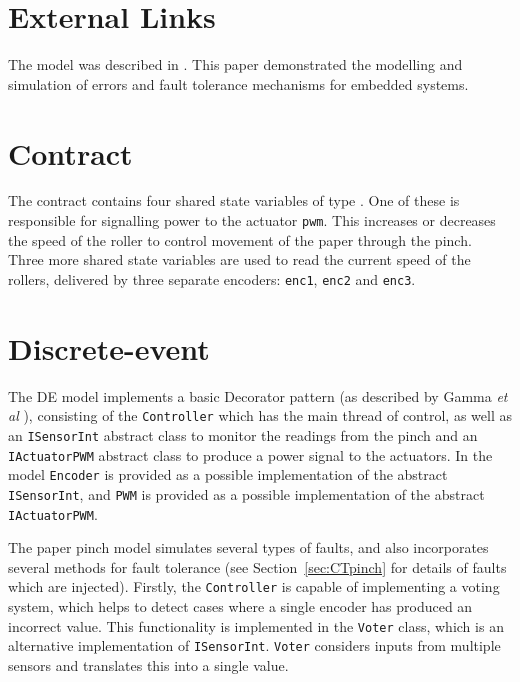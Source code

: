 \section{External Links}
The model was described in \cite{Pierce&11}.  This paper demonstrated
the modelling and simulation of errors and fault tolerance mechanisms
for embedded systems.

\section{Contract} The contract contains four shared state
variables of type . One of these is responsible for
signalling power to the actuator \texttt{pwm}. This increases or
decreases the speed of the roller to control movement of the
paper through the pinch. Three more shared state variables are
used to read the current speed of the rollers, delivered by
three separate encoders: \texttt{enc1}, \texttt{enc2} and
\texttt{enc3}. %

\section{Discrete-event} The DE model implements a basic Decorator
pattern (as described by Gamma \emph{et al} \cite{gamma}), consisting
of the \texttt{Controller} which has the main thread of control, as
well as an \texttt{ISensorInt} abstract class to monitor the readings
from the pinch and an \texttt{IActuatorPWM} abstract class to produce
a power signal to the actuators. In the model \texttt{Encoder} is
provided as a possible implementation of the abstract
\texttt{ISensorInt}, and \texttt{PWM} is provided as a possible
implementation of the abstract \texttt{IActuatorPWM}.

The paper pinch model simulates several types of faults, and also
incorporates several methods for fault tolerance (see
Section~\ref{sec:CTpinch} for details of faults which are
injected). Firstly, the \texttt{Controller} is capable of implementing
a voting system, which helps to detect cases where a single encoder
has produced an incorrect value. This functionality is implemented in
the \texttt{Voter} class, which is an alternative implementation of
\texttt{ISensorInt}.  \texttt{Voter} considers inputs from multiple
sensors and translates this into a single value.

